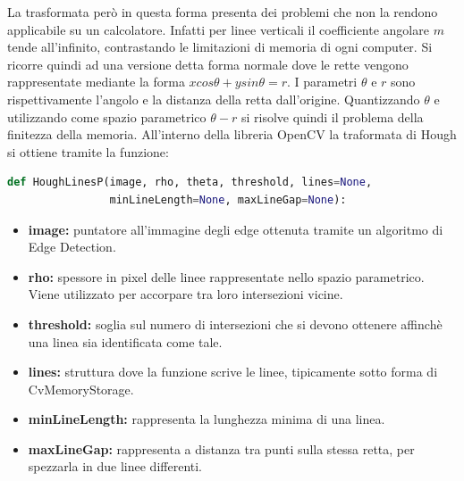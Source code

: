 \documentclass[twoside]{supsistudent}
\begin{document}
La trasformata però in questa forma presenta dei problemi che non la rendono applicabile 
su un calcolatore. Infatti per linee verticali il coefficiente angolare $m$ tende all'infinito, 
contrastando le limitazioni di memoria di ogni computer. Si ricorre quindi ad una versione 
detta forma normale dove le rette vengono rappresentate mediante la forma $xcos\theta+ysin\theta=r$.
I parametri $\theta$ e $r$ sono rispettivamente l'angolo e la distanza della retta dall'origine. 
Quantizzando $\theta$ e utilizzando come spazio parametrico $\theta-r$ si risolve quindi il problema 
della finitezza della memoria.
All'interno della libreria OpenCV la traformata di Hough si ottiene tramite la funzione:
\begin{lstlisting}[language=Python]
def HoughLinesP(image, rho, theta, threshold, lines=None, 
                minLineLength=None, maxLineGap=None):
\end{lstlisting}
\begin{itemize}
  \item \textbf{image:} puntatore all'immagine degli edge ottenuta tramite un algoritmo di 
  Edge Detection.
  \item \textbf{rho:} spessore in pixel delle linee rappresentate nello spazio parametrico. 
  Viene utilizzato per accorpare tra loro intersezioni vicine.
  \item \textbf{threshold:} soglia sul numero di intersezioni che si devono ottenere 
  affinchè una linea sia identificata come tale.
  \item \textbf{lines:} struttura dove la funzione scrive le linee, tipicamente sotto forma 
  di CvMemoryStorage.
  \item \textbf{minLineLength:} rappresenta la lunghezza minima di una linea.
  \item \textbf{maxLineGap:} rappresenta a distanza tra punti sulla stessa retta, per 
  spezzarla in due linee differenti.
\end{itemize}
\end{document}
